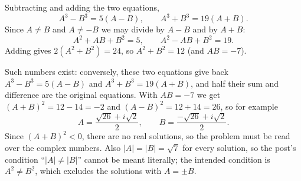 Subtracting and adding the two equations,
\[
A^3-B^3=5(A-B),\qquad A^3+B^3=19(A+B).
\]
Since $A\ne B$ and $A\ne -B$ we may divide by $A-B$ and by $A+B$:
\[
A^2+AB+B^2=5,\qquad A^2-AB+B^2=19 .
\]
Adding gives $2(A^2+B^2)=24$, so $A^2+B^2=\boxed{12}$ (and $AB=-7$).

Such numbers exist: conversely, these two equations give back $A^3-B^3=5(A-B)$ and $A^3+B^3=19(A+B)$, and half their sum and difference are the original equations. With $AB=-7$ we get $(A+B)^2=12-14=-2$ and $(A-B)^2=12+14=26$, so for example
\[
A=\dfrac{\sqrt{26}+i\sqrt2}{2},\qquad B=\dfrac{-\sqrt{26}+i\sqrt2}{2}.
\]
Since $(A+B)^2<0$, there are no real solutions, so the problem must be read over the complex numbers. Also $|A|=|B|=\sqrt7$ for every solution, so the post's condition ``$|A|\ne|B|$'' cannot be meant literally; the intended condition is $A^2\ne B^2$, which excludes the solutions with $A=\pm B$.
